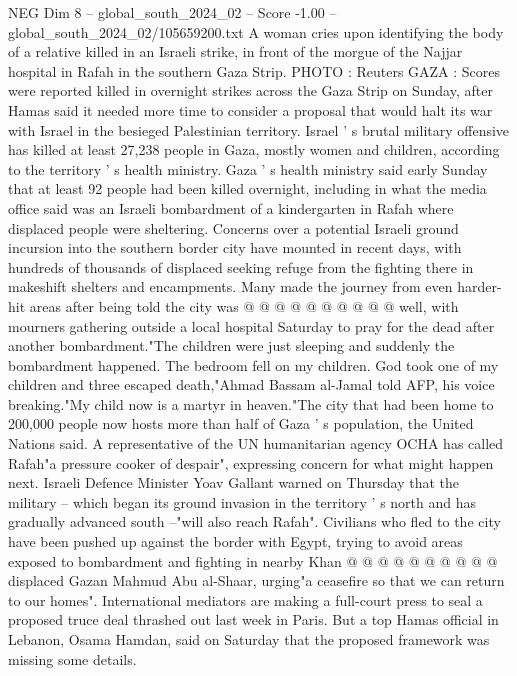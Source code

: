 \begin{textsample}{NEG Dim 8 – global\_south\_2024\_02 – Score -1.00 – global\_south\_2024\_02/105659200.txt}  \label{ex:f8_neg_065}
A woman cries upon identifying the body of a relative killed in an Israeli strike, in front of the morgue of the Najjar hospital in Rafah in the southern Gaza Strip.
PHOTO : Reuters GAZA : Scores were reported killed in overnight strikes across the Gaza Strip on Sunday, after Hamas said it needed more time to consider a proposal that would halt its war with Israel in the besieged Palestinian territory.
Israel ' s brutal military offensive has killed at least 27,238 people in Gaza, mostly women and children, according to the territory ' s health ministry.
Gaza ' s health ministry said early Sunday that at least 92 people had been killed overnight, including in what the media office said was an Israeli bombardment of a kindergarten in Rafah where displaced people were sheltering.
Concerns over a potential Israeli ground incursion into the southern border city have mounted in recent days, with hundreds of thousands of displaced seeking refuge from the fighting there in makeshift shelters and encampments.
Many made the journey from even harder-hit areas after being told the city was @ @ @ @ @ @ @ @ @ @ well, with mourners gathering outside a local hospital Saturday to pray for the dead after another bombardment."The children were just sleeping and suddenly the bombardment happened.
The bedroom fell on my children.
God took one of my children and three escaped death,"Ahmad Bassam al-Jamal told AFP, his voice breaking."My child now is a martyr in heaven."The city that had been home to 200,000 people now hosts more than half of Gaza ' s population, the United Nations said.
A representative of the UN humanitarian agency OCHA has called Rafah"a pressure cooker of despair", expressing concern for what might happen next.
Israeli Defence Minister Yoav Gallant warned on Thursday that the military -- which began its ground invasion in the territory ' s north and has gradually advanced south --"will also reach Rafah".
Civilians who fled to the city have been pushed up against the border with Egypt, trying to avoid areas exposed to bombardment and fighting in nearby Khan @ @ @ @ @ @ @ @ @ @ displaced Gazan Mahmud Abu al-Shaar, urging"a ceasefire so that we can return to our homes".
International mediators are making a full-court press to seal a proposed truce deal thrashed out last week in Paris.
But a top Hamas official in Lebanon, Osama Hamdan, said on Saturday that the proposed framework was missing some details.

\end{textsample}
